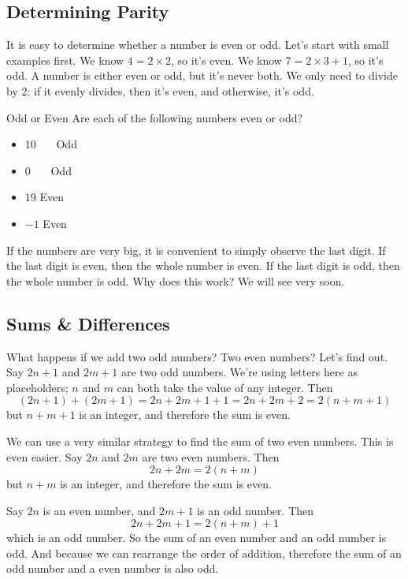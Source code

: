 \documentclass[a4paper,10pt]{report}
\begin{document}
\subsection{Determining Parity}
It is easy to determine whether a number is even or odd. Let's start with small
examples first. We know $4=2\times2$, so it's even. We know $7=2\times3+1$, so
it's odd. A number is either even or odd, but it's never both. We only need to
divide by $2$: if it evenly divides, then it's even, and otherwise, it's odd.

\begin{problem}{Odd or Even}
 Are each of the following numbers even or odd?

 \begin{itemize}
  \item $10$ \hfill {}~~~Odd
  \item $0$ \hfill {}~~~Odd
  \item $19$ \hfill Even~~~
  \item $-1$ \hfill Even~~~
 \end{itemize}
\end{problem}

If the numbers are very big, it is convenient to simply observe the last digit.
If the last digit is even, then the whole number is even. If the last digit is
odd, then the whole number is odd. Why does this work? We will see very soon.

\subsection{Sums \& Differences}

What happens if we add two odd numbers? Two even numbers? Let's find out. Say
$2n+1$ and $2m+1$ are two odd numbers. We're using letters here as placeholders;
$n$ and $m$ can both take the value of any integer. Then \[
 (2n+1) + (2m+1) = 2n + 2m + 1 + 1 = 2n + 2m + 2 = 2(n+m+1)
\] but $n+m+1$ is an integer, and therefore the sum is even.

We can use a very similar strategy to find the sum of two even numbers. This is
even easier. Say $2n$ and $2m$ are two even numbers. Then \[
 2n + 2m = 2(n+m)
\] but $n+m$ is an integer, and therefore the sum is even.

Say $2n$ is an even number, and $2m+1$ is an odd number. Then \[
 2n + 2m + 1 = 2(n+m) + 1
\] which is an odd number. So the sum of an even number and an odd number is
odd. And because we can rearrange the order of addition, therefore the sum of an
odd number and a even number is also odd.
\end{document}
